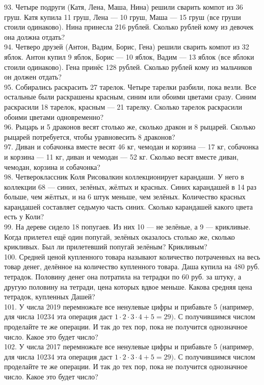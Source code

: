 93. Четыре подруги (Катя, Лена, Маша, Нина) решили сварить компот из 36 груш. Катя купила 11 груш, Лена --- 10 груш, Маша --- 15 груш (все груши стоили одинаково). Нина принесла 216 рублей. Сколько рублей кому из девочек она должна отдать?\\
94. Четверо друзей (Антон, Вадим, Борис, Гена) решили сварить компот из 32 яблок. Антон купил 9 яблок, Борис --- 10 яблок, Вадим --- 13 яблок (все яблоки стоили одинаково). Гена принёс 128 рублей. Сколько рублей кому из мальчиков он должен отдать?\\
95. Собирались раскрасить 27 тарелок. Четыре тарелки разбили, пока везли. Все остальные были раскрашены красным, синим или обоими цветами сразу. Синим раскрасили 18 тарелок, красным --- 21 тарелку. Сколько тарелок раскрасили обоими цветами одновременно?\\
96. Рыцарь и 5 драконов весят столько же, сколько дракон и 8 рыцарей. Сколько рыцарей потребуется, чтобы уравновесить 8 драконов?\\
97. Диван и собачонка вместе весят 46 кг, чемодан и корзина --- 17 кг, собачонка и корзина --- 11 кг, диван и чемодан --- 52 кг. Сколько весят вместе диван, чемодан, корзина и собачонка?\\
98. Четвероклассник Коля Рисовалкин коллекционирует карандаши. У него в коллекции 68 --- синих, зелёных, жёлтых и красных. Синих карандашей в 14 раз больше, чем жёлтых, и на 6 штук меньше, чем зелёных. Количество красных карандашей составляет седьмую часть синих. Сколько карандашей какого цвета есть у Коли?\\
99. На дереве сидело 18 попугаев. Из них 10 --- не зелёные, а 9 --- крикливые. Когда прилетел ещё один попугай, зелёных оказалось столько же, сколько крикливых. Был ли прилетевший попугай зелёным? Крикливым?\\
100. Средней ценой купленного товара называют количество потраченных на весь товар денег, делённое на количество купленного товара. Даша купила на 480 руб. тетрадок. Половину денег она потратила на тетрадки по 60 руб. за штуку, а другую половину на тетради, цена которых вдвое меньше. Какова средняя цена тетрадок, купленных Дашей?\\
101. У числа 2019 перемножьте все ненулевые цифры и прибавьте 5 (например, для числа 10234 эта операция даст $1\cdot2\cdot3\cdot4+5=29).$ С получившимся числом проделайте те же операции. И так до тех пор, пока не получится однозначное число. Какое это будет число?\\
102. У числа 2017 перемножьте все ненулевые цифры и прибавьте 5 (например, для числа 10234 эта операция даст $1\cdot2\cdot3\cdot4+5=29).$ С получившимся числом проделайте те же операции. И так до тех пор, пока не получится однозначное число. Какое это будет число?\\
